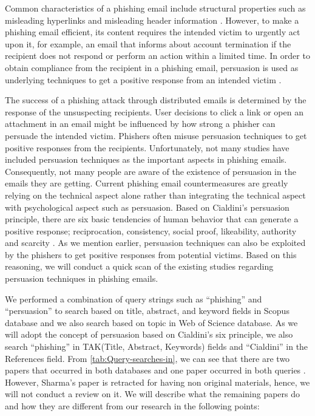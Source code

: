 Common characteristics of a phishing email include structural properties
such as misleading hyperlinks and misleading header information \citep{zhang:2006,zhang:2007}.
However, to make a phishing email efficient, its content requires
the intended victim to urgently act upon it, for example, an email
that informs about account termination if the recipient does not respond
or perform an action within a limited time. In order to obtain compliance
from the recipient in a phishing email, persuasion is used as underlying
techniques to get a positive response from an intended victim \citep{workman:2008}.

The success of a phishing attack through distributed emails is determined
by the response of the unsuspecting recipients. User decisions to
click a link or open an attachment in an email might be influenced
by how strong a phisher can persuade the intended victim. Phishers
often misuse persuasion techniques to get positive responses from
the recipients. Unfortunately, not many studies have included persuasion
techniques as the important aspects in phishing emails. Consequently,
not many people are aware of the existence of persuasion in the emails
they are getting. Current phishing email countermeasures are greatly
relying on the technical aspect alone rather than integrating the
technical aspect with psychological aspect such as persuasion. Based
on Cialdini's persuasion principle, there are six basic tendencies
of human behavior that can generate a positive response; reciprocation,
consistency, social proof, likeability, authority and scarcity \citep{cialdini:2001}.
As we mention earlier, persuasion techniques can also be exploited
by the phishers to get positive responses from potential victims.
Based on this reasoning, we will conduct a quick scan of the existing
studies regarding persuasion techniques in phishing emails.

We performed a combination of query strings such as ``phishing''
and ``persuasion'' to search based on title, abstract, and keyword
fields in Scopus database and we also search based on topic in Web
of Science database. As we will adopt the concept of persuasion based
on Cialdini's six principle, we also search ``phishing'' in TAK(Title,
Abstract, Keywords) fields and ``Cialdini'' in the References field.
From \autoref{tab:Query-searches-in}, we can see that there are two
papers that occurred in both databases \citep{wright2014research,kaivanto2014effect}
and one paper occurred in both queries \citep{wright2014research}.
However, Sharma's paper is retracted for having non original materials,
hence, we will not conduct a review on it. We will describe what the
remaining papers do and how they are different from our research in
the following points:

